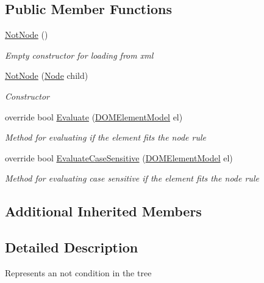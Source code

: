 \subsection*{Public Member Functions}
\begin{DoxyCompactItemize}
\item 
\hyperlink{class_web_analyzer_1_1_models_1_1_settings_model_1_1_expression_tree_1_1_not_node_aa828446c9851f4a025c76b3943f5594b}{Not\+Node} ()
\begin{DoxyCompactList}\small\item\em Empty constructor for loading from xml \end{DoxyCompactList}\item 
\hyperlink{class_web_analyzer_1_1_models_1_1_settings_model_1_1_expression_tree_1_1_not_node_a41d9d4ab20ba1cdc2b562937a98b7b03}{Not\+Node} (\hyperlink{class_web_analyzer_1_1_models_1_1_settings_model_1_1_expression_tree_1_1_node}{Node} child)
\begin{DoxyCompactList}\small\item\em Constructor \end{DoxyCompactList}\item 
override bool \hyperlink{class_web_analyzer_1_1_models_1_1_settings_model_1_1_expression_tree_1_1_not_node_aa3794e368e151ff066abdfbdc5efb406}{Evaluate} (\hyperlink{class_web_analyzer_1_1_models_1_1_data_model_1_1_d_o_m_element_model}{D\+O\+M\+Element\+Model} el)
\begin{DoxyCompactList}\small\item\em Method for evaluating if the element fits the node rule \end{DoxyCompactList}\item 
override bool \hyperlink{class_web_analyzer_1_1_models_1_1_settings_model_1_1_expression_tree_1_1_not_node_a188d7d9fe5ee7ceff3034b393ab8493b}{Evaluate\+Case\+Sensitive} (\hyperlink{class_web_analyzer_1_1_models_1_1_data_model_1_1_d_o_m_element_model}{D\+O\+M\+Element\+Model} el)
\begin{DoxyCompactList}\small\item\em Method for evaluating case sensitive if the element fits the node rule \end{DoxyCompactList}\end{DoxyCompactItemize}
\subsection*{Additional Inherited Members}


\subsection{Detailed Description}
Represents an not condition in the tree 



